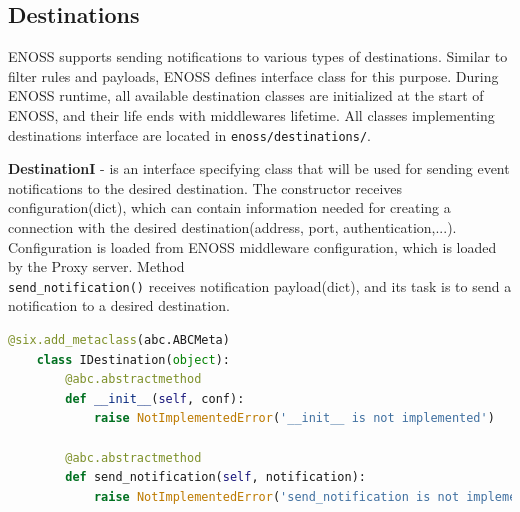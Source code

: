     \subsection{Destinations}
    ENOSS supports sending notifications to various types of destinations. Similar to filter rules and payloads, ENOSS defines interface class for this purpose. During ENOSS runtime, all available destination classes are initialized at the start of ENOSS, and their life ends with middlewares lifetime. All classes implementing destinations interface are located in \texttt{enoss/destinations/}.

    \textbf{DestinationI} - is an interface specifying class that will be used for sending event notifications to the desired destination. The constructor receives configuration(dict), which can contain information needed for creating a connection with the desired destination(address, port, authentication,...). Configuration is loaded from ENOSS middleware configuration, which is loaded by the Proxy server. Method \\\texttt{send\_notification()} receives notification payload(dict), and its task is to send a notification to a desired destination.

    \begin{lstlisting}[language=Python, style=pythonStyle, caption=Interface of class used for sending notification message to desired destination, label=lst:enoss-destinationi]
    @six.add_metaclass(abc.ABCMeta)
    class IDestination(object):
        @abc.abstractmethod
        def __init__(self, conf):
            raise NotImplementedError('__init__ is not implemented')

        @abc.abstractmethod
        def send_notification(self, notification):
            raise NotImplementedError('send_notification is not implemented')
    \end{lstlisting}

